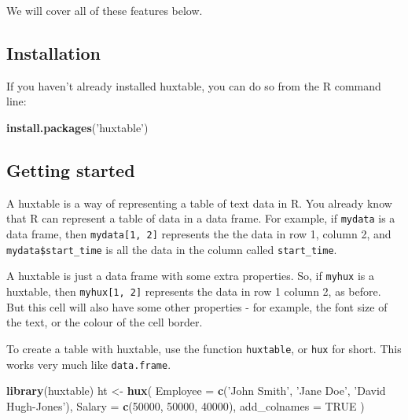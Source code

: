 \documentclass[]{article}
\newenvironment{Shaded}{\begin{snugshade}}{\end{snugshade}}
\newcommand{\DataTypeTok}[1]{\textcolor[rgb]{0.13,0.29,0.53}{#1}}
\newcommand{\DecValTok}[1]{\textcolor[rgb]{0.00,0.00,0.81}{#1}}
\newcommand{\KeywordTok}[1]{\textcolor[rgb]{0.13,0.29,0.53}{\textbf{#1}}}
\newcommand{\NormalTok}[1]{#1}
\newcommand{\OtherTok}[1]{\textcolor[rgb]{0.56,0.35,0.01}{#1}}
\newcommand{\StringTok}[1]{\textcolor[rgb]{0.31,0.60,0.02}{#1}}
\begin{document}
We will cover all of these features below.

\hypertarget{installation}{%
\subsection{Installation}\label{installation}}

If you haven't already installed huxtable, you can do so from the R
command line:

\begin{Shaded}
\begin{Highlighting}[]
\KeywordTok{install.packages}\NormalTok{(}\StringTok{'huxtable'}\NormalTok{)}
\end{Highlighting}
\end{Shaded}

\FloatBarrier

\hypertarget{getting-started}{%
\subsection{Getting started}\label{getting-started}}

A huxtable is a way of representing a table of text data in R. You
already know that R can represent a table of data in a data frame. For
example, if \texttt{mydata} is a data frame, then
\texttt{mydata{[}1,\ 2{]}} represents the the data in row 1, column 2,
and \texttt{mydata\$start\_time} is all the data in the column called
\texttt{start\_time}.

A huxtable is just a data frame with some extra properties. So, if
\texttt{myhux} is a huxtable, then \texttt{myhux{[}1,\ 2{]}} represents
the data in row 1 column 2, as before. But this cell will also have some
other properties - for example, the font size of the text, or the colour
of the cell border.

To create a table with huxtable, use the function \texttt{huxtable}, or
\texttt{hux} for short. This works very much like \texttt{data.frame}.

\begin{Shaded}
\begin{Highlighting}[]
\KeywordTok{library}\NormalTok{(huxtable)}
\NormalTok{ht <-}\StringTok{ }\KeywordTok{hux}\NormalTok{(}
        \DataTypeTok{Employee     =} \KeywordTok{c}\NormalTok{(}\StringTok{'John Smith'}\NormalTok{, }\StringTok{'Jane Doe'}\NormalTok{, }\StringTok{'David Hugh-Jones'}\NormalTok{), }
        \DataTypeTok{Salary       =} \KeywordTok{c}\NormalTok{(}\DecValTok{50000}\NormalTok{, }\DecValTok{50000}\NormalTok{, }\DecValTok{40000}\NormalTok{),}
        \DataTypeTok{add_colnames =} \OtherTok{TRUE}
\NormalTok{      )}
\end{Highlighting}
\end{Shaded}
\end{document}
